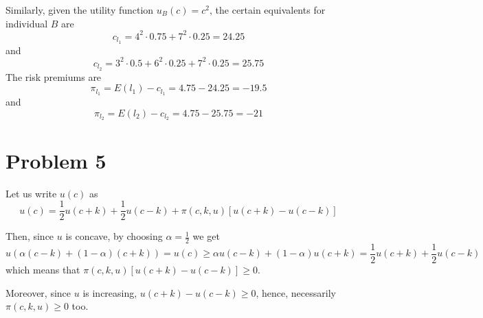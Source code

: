 \documentclass[12pt]{extarticle}
\numberwithin{table}{section}
\numberwithin{figure}{section}
\numberwithin{equation}{section}
\begin{document}
Similarly, given the utility function $u_B(c) = c^2$, the certain equivalents for individual $B$ are
\begin{equation}
    c_{l_1} = 4^2 \cdot 0.75 + 7^2 \cdot 0.25 = 24.25
\end{equation}
and
\begin{equation}
    c_{l_2} = 3^2 \cdot 0.5 + 6^2 \cdot 0.25 + 7^2 \cdot 0.25 = 25.75
\end{equation}
The risk premiums are
\begin{equation}
    \pi_{l_1} = E(l_1) - c_{l_1} = 4.75 - 24.25 = -19.5
\end{equation}
and
\begin{equation}
    \pi_{l_2} = E(l_2) - c_{l_2} = 4.75 - 25.75 = -21
\end{equation}

\section*{Problem 5}

Let us write $u(c)$ as
\begin{equation}
    u(c) = \frac{1}{2} u(c + k) + \frac{1}{2} u(c-k) + \pi(c, k, u) [ u(c + k) - u(c-k)]
\end{equation}

Then, since $u$ is concave, by choosing $\alpha = \frac{1}{2}$ we get
\begin{equation}
    u(\alpha (c - k) + (1-\alpha) (c + k)) = u(c) \geq \alpha u(c - k) + (1-\alpha) u(c+k) = \frac{1}{2} u(c + k) + \frac{1}{2} u(c-k)
\end{equation}
which means that $\pi(c, k, u) [ u(c + k) - u(c-k)] \geq 0$.

Moreover, since $u$ is increasing, $u(c + k) - u(c-k) \geq 0$, hence, necessarily $\pi(c, k, u) \geq 0$ too.
\end{document}
